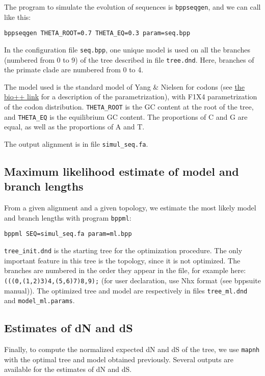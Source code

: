 \documentclass[11pt, a4paper]{article}
\begin{document}
The program to simulate the evolution of sequences is
\texttt{bppseqgen}, and we can call like this:

\begin{verbatim}
bppseqgen THETA_ROOT=0.7 THETA_EQ=0.3 param=seq.bpp
\end{verbatim}

In the configuration file \texttt{seq.bpp}, one unique model is used
on all the branches (numbered from 0 to 9) of the tree described in
file \texttt{tree.dnd}. Here, branches of the primate clade are
numbered from 0 to 4. 

The model used is the standard model of Yang \& Nielsen for codons
(see
\href{https://pbil.univ-lyon1.fr/bpp-doc/bpp-phyl/html/classbpp_1_1YN98.html\#details}{the
  bio++ link} for a description of the parametrization), with F1X4
parametrization of the codon distribution. \verb|THETA_ROOT| is the GC
content at the root of the tree, and \verb|THETA_EQ| is the
equilibrium GC content. The proportions of C and G are equal, as well
as the proportions of A and T.

The output alignment is in file \texttt{simul\_seq.fa}.


\subsection*{Maximum likelihood estimate of model and branch lengths}

From a given alignment and a given topology, we estimate the most
likely model and branch lengths with program \texttt{bppml}:

\begin{verbatim}
bppml SEQ=simul_seq.fa param=ml.bpp
\end{verbatim}

\texttt{tree\_init.dnd} is the starting tree for the optimization
procedure. The only important feature in this tree is the topology,
since it is not optimized. The branches are numbered in the order they
appear in the file, for example here:
\texttt{(((0,(1,2)3)4,(5,6)7)8,9);} (for user declaration, use Nhx
format (see bppsuite manual)). The optimized tree and model are
respectively in files \texttt{tree\_ml.dnd} and
\texttt{model\_ml.params}.

\subsection*{Estimates of dN and dS}

Finally, to compute the normalized expected dN and dS of the tree, we
use \texttt{mapnh} with the optimal tree and model obtained
previously. Several outputs are available for the estimates of dN and
dS.
\end{document}
